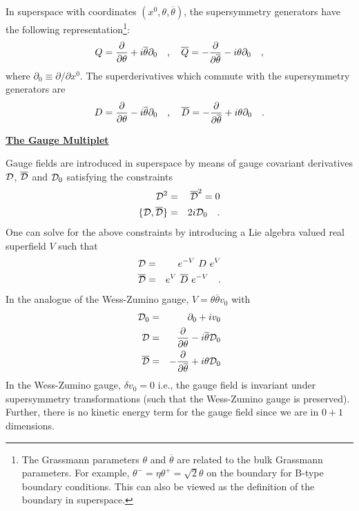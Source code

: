 \documentclass[a4paper,12pt]{article}
\begin{document}
In superspace with coordinates $(x^0,\theta,\overline{\theta})$,
the supersymmetry generators have the following
representation\footnote{The Grassmann parameters $\theta$ and
$\overline{\theta}$ are related to the bulk Grassmann parameters.
For example, $\theta^-=\eta\theta^+ =\sqrt2\theta$ on the boundary
for B-type boundary conditions. 
This can also be viewed as the definition of the boundary in
superspace.}:
\begin{equation}
Q= {\partial\over{\partial\theta}} + i \overline{\theta}
\partial_0 \quad,\quad
\overline{Q}= -{\partial\over{\partial\overline{\theta}}} - i \theta
\partial_0 \quad,
\end{equation}
where $\partial_0\equiv \partial/\partial x^0$.
The superderivatives which commute with the supersymmetry generators
are
\begin{equation}
D= {\partial\over{\partial\theta}} - i \overline{\theta}
\partial_0 \quad,\quad
\overline{D}= -{\partial\over{\partial\overline{\theta}}} + i \theta
\partial_0 \quad.
\end{equation}
\bigskip
\begin{flushleft}
{\underline{\bf The Gauge Multiplet}}
\end{flushleft}

Gauge fields are introduced in superspace by means of gauge covariant
derivatives ${\cal D}$, $\overline{\cal D}$ and ${\cal D}_0$
satisfying the constraints
\begin{eqnarray}
{\cal D}^2 &=& \overline{\cal D}^2 =0 \nonumber \\
\{{\cal D}, \overline{\cal D} \} &=& 2i {\cal D}_0\quad.
\end{eqnarray}
One can solve for the above constraints by introducing a Lie algebra
valued real superfield $V$ such that
\begin{eqnarray}
{\cal D} &=& e^{-V}\ D\ e^{V} \nonumber \\
\overline{\cal D} &=& e^{V}\ \overline{D}\ e^{-V}\quad.
\end{eqnarray}
In the analogue of the Wess-Zumino gauge, $V=\theta \overline{\theta}
v_0$ with
\begin{eqnarray}
{\cal D}_0 &=& \partial_0 + i v_0 \nonumber \\
{\cal D} &=& {\partial\over{\partial\theta}} - i \overline{\theta}
{\cal D}_0 \\
\overline{\cal D}&=& -{\partial\over{\partial\overline{\theta}}} + i \theta
{\cal D}_0 \nonumber
\end{eqnarray}
In the Wess-Zumino gauge, $\delta v_0 =0$ i.e., the gauge field is
invariant under supersymmetry transformations (such that the
Wess-Zumino gauge is preserved). Further, there is no kinetic energy
term for the gauge field since we are in $0+1$ dimensions.
\end{document}
